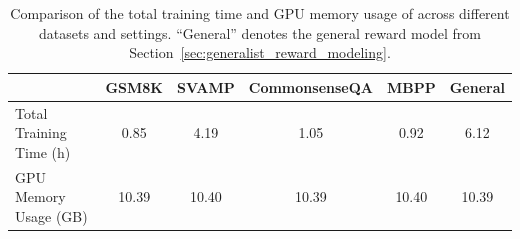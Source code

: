 \begin{table}[t]
\centering
\small
\newcommand{\newscriptspace}{\makebox[\widthof{0}]{}}
\caption{Comparison of the total training time and GPU memory usage of \LRM across different datasets and settings. ``General'' denotes the general reward model from Section~\ref{sec:generalist_reward_modeling}.}
\begin{tabular}{lccccc}
\toprule
                       & 
                       \textbf{GSM8K}&\textbf{SVAMP} & \textbf{CommonsenseQA}  & \textbf{MBPP} & \textbf{General}
\\ \midrule 
Total Training Time (h)&\newscriptspace0.85&\newscriptspace4.19&\newscriptspace1.05&\newscriptspace0.92&\newscriptspace6.12\\
GPU Memory Usage (GB)&10.39&10.40&10.39&10.40&10.39\\
\bottomrule
\end{tabular}
\label{tab:training_efficiency_analysis}
\end{table}
